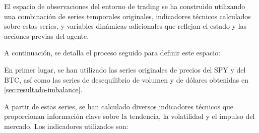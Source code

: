 \documentclass[a4paper,12pt, twoside]{report}
\begin{document}
El espacio de observaciones del entorno de trading se ha construido utilizando una 
combinación de series temporales originales, indicadores técnicos calculados sobre 
estas series, y variables dinámicas adicionales que reflejan el estado y las acciones 
previas del agente. 

A continuación, se detalla el proceso seguido para definir este espacio:

En primer lugar, se han utilizado las series originales de precios del SPY y del BTC, 
así como las series de desequilibrio de volumen y de dólares obtenidas en \ref{sec:resultado-imbalance}.

A partir de estas series, se han calculado diversos indicadores técnicos que proporcionan información clave sobre la tendencia, la volatilidad y el impulso del mercado. Los indicadores utilizados son:
\end{document}
